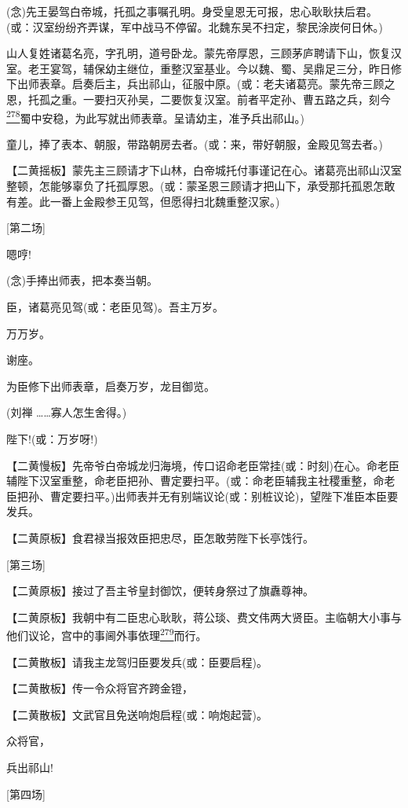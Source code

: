 (念)先王晏驾白帝城，托孤之事嘱孔明。身受皇恩无可报，忠心耿耿扶后君。(或：汉室纷纷齐弄谋，军中战马不停留。北魏东吴不扫定，黎民涂炭何日休。)

山人复姓诸葛名亮，字孔明，道号卧龙。蒙先帝厚恩，三顾茅庐聘请下山，恢复汉室。老王宴驾，辅保幼主继位，重整汉室基业。今以魏、蜀、吴鼎足三分，昨日修下出师表章。启奏后主，兵出祁山，征服中原。(或：老夫诸葛亮。蒙先帝三顾之恩，托孤之重。一要扫灭孙吴，二要恢复汉室。前者平定孙、曹五路之兵，刻今\protect\hyperlink{fn278}{\textsuperscript{278}}蜀中安稳，为此写就出师表章。呈请幼主，准予兵出祁山。)

童儿，捧了表本、朝服，带路朝房去者。(或：来，带好朝服，金殿见驾去者。)

【二黄摇板】蒙先主三顾请才下山林，白帝城托付事谨记在心。诸葛亮出祁山汉室整顿，怎能够辜负了托孤厚恩。(或：蒙圣恩三顾请才把山下，承受那托孤恩怎敢有差。此一番上金殿参王见驾，但愿得扫北魏重整汉家。)

{[}第二场{]}

嗯哼!

(念)手捧出师表，把本奏当朝。

臣，诸葛亮见驾(或：老臣见驾)。吾主万岁。

万万岁。

谢座。

为臣修下出师表章，启奏万岁，龙目御览。

(刘禅 \ldots{}\ldots{}寡人怎生舍得。)

陛下!(或：万岁呀!)

【二黄慢板】先帝爷白帝城龙归海境，传口诏命老臣常挂(或：时刻)在心。命老臣辅陛下汉室重整，命老臣把孙、曹定要扫平。(或：命老臣辅我主社稷重整，命老臣把孙、曹定要扫平。)出师表并无有别端议论(或：别桩议论)，望陛下准臣本臣要发兵。

【二黄原板】食君禄当报效臣把忠尽，臣怎敢劳陛下长亭饯行。

{[}第三场{]}

【二黄原板】接过了吾主爷皇封御饮，便转身祭过了旗纛尊神。

【二黄原板】我朝中有二臣忠心耿耿，蒋公琰、费文伟两大贤臣。主临朝大小事与他们议论，宫中的事阃外事依理\protect\hyperlink{fn279}{\textsuperscript{279}}而行。

【二黄散板】请我主龙驾归臣要发兵(或：臣要启程)。

【二黄散板】传一令众将官齐跨金镫，

【二黄散板】文武官且免送响炮启程(或：响炮起营)。

众将官，

兵出祁山!

{[}第四场{]}

